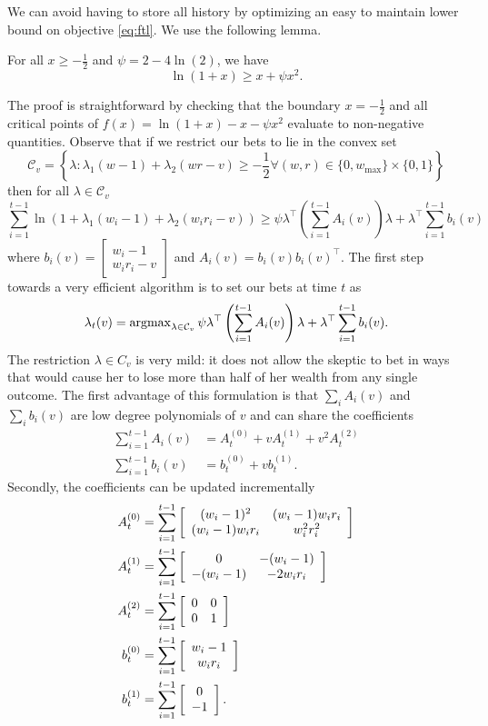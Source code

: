 We can avoid having to store all history by optimizing
an easy to maintain lower bound on objective \eqref{eq:ftl}.
We use the following lemma.
\begin{lemma} 
\label{lem:quadbound}
For all $x\geq -\frac{1}{2}$ and $\psi=2-4\ln(2)$, we have
\[
\ln(1+x)\geq x + \psi x^2.
\]
\end{lemma}
The proof is straightforward by checking that the boundary $x=-\frac{1}{2}$ and all critical points of $f(x) = \ln(1+x)- x - \psi x^2$ evaluate to non-negative quantities. Observe that if we restrict our bets to lie in the convex set
\begin{equation}
\mathcal{C}_v = \left\{\lambda: \lambda_1 (w-1)+\lambda_2 (wr -v ) \geq -\frac{1}{2} \allowbreak \forall (w,r) \in \{0,w_{\max}\}\times \{0,1\} \right\}
\label{eq:quadfeasible}
\end{equation}
then for all $\lambda \in \mathcal{C}_v$
\[
\sum_{i=1}^{t-1} \ln(1+\lambda_1 (w_i-1)+\lambda_2(w_i r_i - v)) 
\geq
\psi  
\lambda^\top \left(\sum_{i=1}^{t-1} A_i(v)\right) \lambda + \lambda^\top \sum_{i=1}^{t-1} b_i(v)
\]
where 
$b_i(v)=
\left[\begin{array}{c} 
w_i-1 \\ w_i r_i -v 
\end{array}\right] 
$
and 
$
A_i(v) = b_i(v)b_i(v)^\top.
$
The first step towards a very efficient algorithm is to 
set our bets at time $t$ as
\begin{equation}
\lambda_t(v) = \operatorname{argmax}_{\lambda \in \mathcal{C}_v}
\psi  \lambda^\top \left(\sum_{i=1}^{t-1} A_i(v)\right) \lambda 
+ \lambda^\top \sum_{i=1}^{t-1} b_i(v).
\label{eq:quadoptv}
\end{equation}
The restriction $\lambda \in C_v$ is very mild: it does 
not allow the skeptic to bet in ways that would cause her 
to lose more than half of her wealth from any single outcome.
The first advantage of this formulation is that 
$\sum_i A_i(v)$ and $\sum_i b_i(v)$ are low degree 
polynomials of $v$ and can share the coefficients
    \begin{align*}
        \sum_{i=1}^{t-1} A_i(v) &= 
        A_t^{(0)} + v A_t^{(1)} + v^2 A_t^{(2)}\\   
        \sum_{i=1}^{t-1} b_i(v) &= b_t^{(0)} + v b_t^{(1)}.  
    \end{align*}
Secondly, the coefficients can be updated incrementally
    \begin{align}
        A_t^{(0)} &=\sum_{i=1}^{t-1}\left[\begin{array}{cc} (w_i-1)^2 & (w_i-1)w_i r_i \\ (w_i-1)w_i r_i & w_i^2r_i^2 \end{array}\right] \label{eq:upsuffa0}\\
        A_t^{(1)} &= \sum_{i=1}^{t-1} \left[\begin{array}{cc} 0 & -(w_i-1) \\ -(w_i-1) & -2w_ir_i \end{array}\right]\\
        A_t^{(2)} &=\sum_{i=1}^{t-1}  \left[\begin{array}{cc} 0 & 0 \\ 0 & 1 \end{array}\right]\\
        b_t^{(0)} &=\sum_{i=1}^{t-1}  \left[\begin{array}{c} w_i-1 \\ w_ir_i \end{array}\right]\\
        b_t^{(1)} &=\sum_{i=1}^{t-1}  \left[\begin{array}{c} 0 \\ -1 \end{array}\right]. \label{eq:upsuffb1}
    \end{align}
